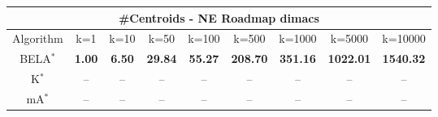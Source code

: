 \begin{tabular}{c|cccccccc}\toprule
\multicolumn{9}{c}{#Centroids - NE Roadmap dimacs}\\ \midrule
Algorithm & k=1 & k=10 & k=50 & k=100 & k=500 & k=1000 & k=5000 & k=10000 \\ \midrule
BELA$^*$ & \textbf{1.00} & \textbf{6.50} & \textbf{29.84} & \textbf{55.27} & \textbf{208.70} & \textbf{351.16} & \textbf{1022.01} & \textbf{1540.32} \\
K$^*$ & -- & -- & -- & -- & -- & -- & -- & -- \\
mA$^*$ & -- & -- & -- & -- & -- & -- & -- & -- \\ \bottomrule 
\end{tabular}

